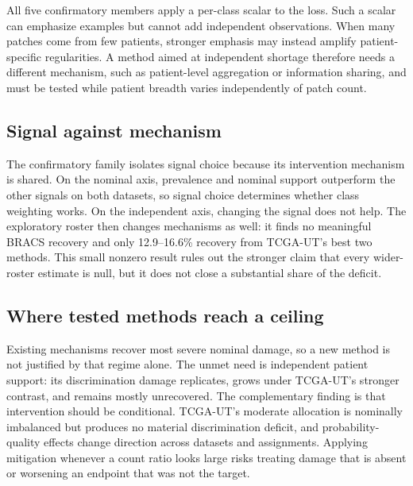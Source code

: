 \documentclass[11pt]{article}
\begin{document}
All five confirmatory members apply a per-class scalar to the loss. Such a scalar can emphasize examples but cannot add independent observations. When many patches come from few patients, stronger emphasis may instead amplify patient-specific regularities. A method aimed at independent shortage therefore needs a different mechanism, such as patient-level aggregation or information sharing, and must be tested while patient breadth varies independently of patch count.

\subsection{Signal against mechanism}
\label{sec:discussion-mechanism}
The confirmatory family isolates signal choice because its intervention mechanism is shared. On the nominal axis, prevalence and nominal support outperform the other signals on both datasets, so signal choice determines whether class weighting works. On the independent axis, changing the signal does not help. The exploratory roster then changes mechanisms as well: it finds no meaningful BRACS recovery and only \num{12.9}--\num{16.6}\% recovery from TCGA-UT's best two methods. This small nonzero result rules out the stronger claim that every wider-roster estimate is null, but it does not close a substantial share of the deficit.

\subsection{Where tested methods reach a ceiling}
\label{sec:discussion-ceiling}
Existing mechanisms recover most severe nominal damage, so a new method is not justified by that regime alone. The unmet need is independent patient support: its discrimination damage replicates, grows under TCGA-UT's stronger contrast, and remains mostly unrecovered. The complementary finding is that intervention should be conditional. TCGA-UT's moderate allocation is nominally imbalanced but produces no material discrimination deficit, and probability-quality effects change direction across datasets and assignments. Applying mitigation whenever a count ratio looks large risks treating damage that is absent or worsening an endpoint that was not the target.
\end{document}
